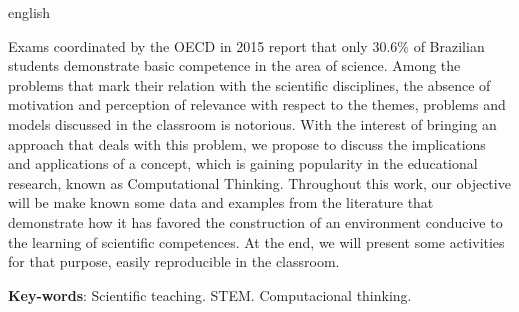 \begin{resumo}[Abstract]
 \begin{otherlanguage*}{english}
  
  Exams coordinated by the OECD in 2015 report that only $ 30.6 \% $ of Brazilian students demonstrate basic competence in the area of science. Among the problems that mark their relation with the scientific disciplines, the absence of motivation and perception of relevance with respect to the themes, problems and models discussed in the classroom is notorious. With the interest of bringing an approach that deals with this problem, we propose to discuss the implications and applications of a concept, which is gaining popularity in the educational research, known as Computational Thinking. Throughout this work, our objective will be make known some data and examples from the literature that demonstrate how it has favored the construction of an environment conducive to the learning of scientific competences. At the end, we will present some activities for that purpose, easily reproducible in the classroom.
   \vspace{\onelineskip}
 
   \noindent 
   \textbf{Key-words}: Scientific teaching. STEM. Computacional thinking.
 \end{otherlanguage*}
\end{resumo}


